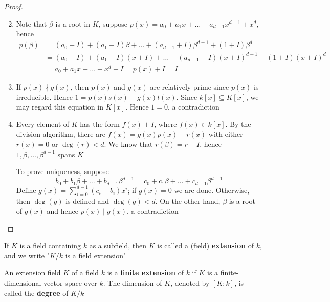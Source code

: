\documentclass[11pt]{article}
\begin{document}
\begin{proof}
\begin{enumerate}
\setcounter{enumi}{1}
\item Note that \(\beta\) is a root in \(K\), suppose 
\(p(x)=a_0+a_1x+\dots+a_{d-1}x^{d-1}+x^d\), hence
\begin{align*}
p(\beta)&=(a_0+I)+(a_1+I)\beta+\dots+(a_{d-1}+I)\beta^{d-1}+(1+I)\beta^{d}\\
&=(a_0+I)+(a_1+I)(x+I)+\dots+(a_{d-1}+I)(x+I)^{d-1}+(1+I)(x+I)^d\\
&=a_0+a_1x+\dots+x^d+I=p(x)+I=I
\end{align*}
\item If \(p(x)\nmid g(x)\), then \(p(x)\) and \(g(x)\) are relatively prime
since \(p(x)\) is irreducible. Hence \(1=p(x)s(x)+g(x)t(x)\). Since 
\(k[x]\subseteq K[x]\), we may regard this equation in \(K[x]\). Hence
\(1=0\), a contradiction
\setcounter{enumi}{4}
\item Every element of \(K\) has the form \(f(x)+I\), where \(f(x)\in k[x]\).
By the division algorithm, there are \(f(x)=g(x)p(x)+r(x)\) with either 
\(r(x)=0\) or \(\deg(r)< d\). We know that \(r(\beta)=r+I\), hence 
\(1,\beta,\dots,\beta^{d-1}\) spans \(K\)

To prove uniqueness, suppose
\begin{equation*}
b_0+b_1\beta+\dots+b_{d-1}\beta^{d-1}=c_0+c_1\beta+\dots+c_{d-1}\beta^{d-1}
\end{equation*}
Define \(g(x)=\sum_{i=0}^{d-1}(c_i-b_i)x^i\); if \(g(x)=0\) we are done.
Otherwise, then \(\deg(g)\) is defined and \(\deg(g)<d\). On the other
hand, \(\beta\) is a root of \(g(x)\) and hence \(p(x)\mid g(x)\), a contradiction
\end{enumerate}
\end{proof}

\begin{definition}[]
If \(K\) is a field containing \(k\) as a subfield, then \(K\) is called a (field) 
\textbf{extension} of \(k\), and we write "\(K/k\) is a field extension"

An extension field \(K\) of a field \(k\) is a \textbf{finite extension} of \(k\) if \(K\) is
a finite-dimensional vector space over \(k\). The dimension of \(K\), denoted by
\([K:k]\), is called the \textbf{degree} of \(K/k\)
\end{definition}
\end{document}
